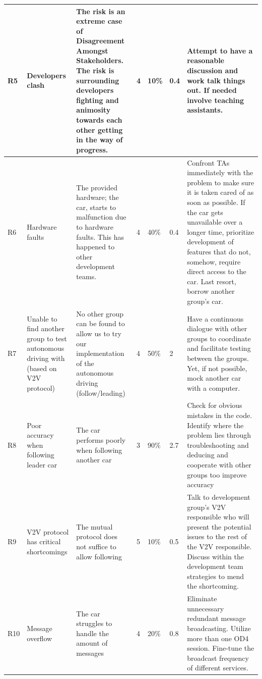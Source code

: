 \documentclass[12pt]{article}
\begin{document}
\begin{longtable}{| p{0.06\linewidth} | p{0.20\linewidth} | p{0.25\linewidth} | p{0.04\linewidth} | p{0.05\linewidth} | p{0.05\linewidth} | p{0.35\linewidth}|}
	R5 & 
Developers clash &
The risk is an extreme case of Disagreement Amongst Stakeholders. The risk is surrounding developers fighting and animosity towards each other getting in the way of progress.&
4 & 
10\% & 
0.4 &
Attempt to have a reasonable discussion and work talk things out. If needed involve teaching assistants. \\ \hline

	R6 & 
Hardware faults &
The provided hardware; the car, starts to malfunction due to hardware faults. This has happened to other development teams. &
4 & 
40\% & 
0.4 &
Confront TAs immediately with the problem to make sure it is taken cared of as soon as possible. If the car gets unavailable over a longer time, prioritize development of features that do not, somehow, require direct access to the car. Last resort, borrow another group's car. \\ \hline

	R7 & 
Unable to find another group to test autonomous driving with (based on V2V protocol) &
No other group can be found to allow us to try our implementation of the autonomous driving (follow/leading) &
4 & 
50\% & 
2 &
Have a continuous dialogue with other groups to coordinate and facilitate testing between the groups. Yet, if not possible, mock another car with a computer. \\ \hline

	R8 & 
Poor accuracy when following leader car &
The car performs poorly when following another car &
3 & 
90\% & 
2.7 &
Check for obvious mistakes in the code. Identify where the problem lies through troubleshooting and deducing and cooperate with other groups too improve accuracy \\ \hline

	R9 & 
V2V protocol has critical shortcomings &
The mutual protocol does not suffice to allow following &
5 & 
10\% & 
0.5 &
Talk to development group's V2V responsible who will present the potential issues to the rest of the V2V responsible. Discuss within the development team strategies to mend the shortcoming. \\ \hline

	R10 & 
Message overflow &
The car struggles to handle the amount of messages &
4 & 
20\% & 
0.8 &
Eliminate unnecessary redundant message broadcasting. Utilize more than one OD4 session. Fine-tune the broadcast frequency of different services. \\ \hline
\end{longtable}
\pagebreak
\end{document}
